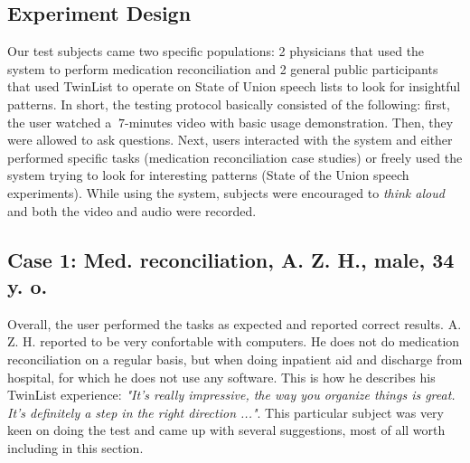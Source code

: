 \documentclass{chi2009}
\begin{document}
\subsection{Experiment Design}

Our test subjects came two specific populations: 2 physicians that used the system to perform medication reconciliation and 2 general public participants that used TwinList to operate on State of Union speech lists to look for insightful patterns. In short, the testing protocol basically consisted of the following: first, the user watched a $~7$-minutes video with basic usage demonstration.  Then, they were allowed to ask questions. Next, users interacted with the system and either performed specific tasks (medication reconciliation case studies) or freely used the system trying to look for interesting patterns (State of the Union speech experiments). While using the system, subjects were encouraged to \textit{think aloud} and both the video and audio were recorded. 

\subsection{Case 1: Med. reconciliation, A. Z. H., male, 34 y. o.}

Overall, the user performed the tasks as expected and reported correct results. A. Z. H. reported to be very confortable with computers. He does not do medication reconciliation on a regular basis, but when doing inpatient aid and discharge from hospital, for which he does not use any software. This is how he describes his TwinList experience: \textit{"It's really impressive, the way you organize things is great. It's definitely a step in the right direction ..."}. This particular subject was very keen on doing the test and came up with several suggestions, most of all worth including in this section. 
\end{document}
